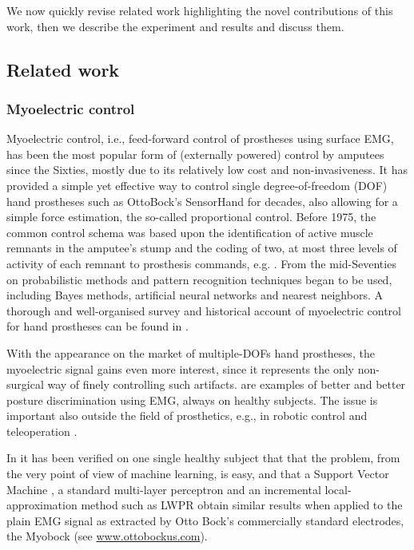 We now quickly revise related work highlighting the novel contributions of this
work, then we describe the experiment and results and discuss them.

\subsection{Related work}

\subsubsection{Myoelectric control}

Myoelectric control, i.e., feed-forward control of prostheses using surface EMG,
has been the most popular form of (externally powered) control by amputees since
the Sixties, mostly due to its relatively low cost and non-invasiveness. It has
provided a simple yet effective way to control single degree-of-freedom (DOF) hand
prostheses such as OttoBock's SensorHand for decades, also allowing for a simple
force estimation, the so-called proportional control. Before 1975, the common
control schema was based upon the identification of active muscle remnants in the
amputee's stump and the coding of two, at most three levels of activity of each
remnant to prosthesis commands, e.g. \cite{bottomley65,childress69}. From the mid-Seventies
on probabilistic methods and pattern recognition techniques began to be used,
including Bayes methods, artificial neural networks and nearest neighbors. 
A thorough and well-organised survey and historical account of myoelectric
control for hand prostheses can be found in \cite{englehart06}.

With the appearance on the market of multiple-DOFs hand prostheses, the myoelectric
signal gains even more interest, since it represents the only non-surgical
way of finely controlling such artifacts. \cite{englehart01,dunlop,smagt06} are
examples of better and better posture discrimination using EMG, always on healthy
subjects. The issue is important also outside the field of prosthetics, e.g., in
robotic control and teleoperation \cite{fukuda,yokoi}.

In \cite{2008.ICRA,2008.BioCyb} it has been verified on one single healthy subject
that that the problem, from the very point of view of machine learning,
is easy, and that a Support Vector Machine \cite{BGV92},
a standard multi-layer perceptron and an incremental local-approximation
method such as LWPR \cite{lwpr} obtain similar results when applied to the plain EMG
signal as extracted by Otto Bock's commercially standard electrodes, the Myobock
(see \url{www.ottobockus.com}).

